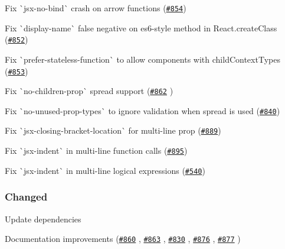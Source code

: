 \begin{DoxyItemize}
\item Fix \`{}jsx-\/no-\/bind\`{} crash on arrow functions (\href{https://github.com/yannickcr/eslint-plugin-react/issues/854}{\tt \#854})
\item Fix \`{}display-\/name\`{} false negative on es6-\/style method in {\ttfamily React.\+create\+Class} (\href{https://github.com/yannickcr/eslint-plugin-react/issues/852}{\tt \#852})
\item Fix \`{}prefer-\/stateless-\/function\`{} to allow components with {\ttfamily child\+Context\+Types} (\href{https://github.com/yannickcr/eslint-plugin-react/issues/853}{\tt \#853})
\item Fix \`{}no-\/children-\/prop\`{} spread support (\href{https://github.com/yannickcr/eslint-plugin-react/pull/862}{\tt \#862} )
\item Fix \`{}no-\/unused-\/prop-\/types\`{} to ignore validation when spread is used (\href{https://github.com/yannickcr/eslint-plugin-react/issues/840}{\tt \#840})
\item Fix \`{}jsx-\/closing-\/bracket-\/location\`{} for multi-\/line prop (\href{https://github.com/yannickcr/eslint-plugin-react/issues/889}{\tt \#889})
\item Fix \`{}jsx-\/indent\`{} in multi-\/line function calls (\href{https://github.com/yannickcr/eslint-plugin-react/issues/895}{\tt \#895})
\item Fix \`{}jsx-\/indent\`{} in multi-\/line logical expressions (\href{https://github.com/yannickcr/eslint-plugin-react/issues/540}{\tt \#540})
\end{DoxyItemize}

\subsubsection*{Changed}


\begin{DoxyItemize}
\item Update dependencies
\item Documentation improvements (\href{https://github.com/yannickcr/eslint-plugin-react/pull/860}{\tt \#860} , \href{https://github.com/yannickcr/eslint-plugin-react/pull/863}{\tt \#863} , \href{https://github.com/yannickcr/eslint-plugin-react/pull/830}{\tt \#830} , \href{https://github.com/yannickcr/eslint-plugin-react/pull/876}{\tt \#876} , \href{https://github.com/yannickcr/eslint-plugin-react/pull/877}{\tt \#877} )
\end{DoxyItemize}

